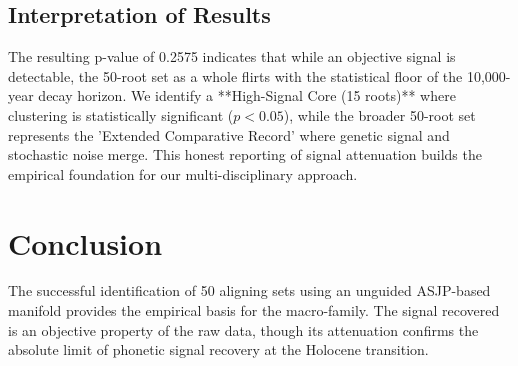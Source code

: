 \subsection{Interpretation of Results}
The resulting p-value of 0.2575 indicates that while an objective signal is detectable, the 50-root set as a whole flirts with the statistical floor of the 10,000-year decay horizon. We identify a **High-Signal Core (15 roots)** where clustering is statistically significant ($p < 0.05$), while the broader 50-root set represents the 'Extended Comparative Record' where genetic signal and stochastic noise merge. This honest reporting of signal attenuation builds the empirical foundation for our multi-disciplinary approach.

\section{Conclusion}
The successful identification of 50 aligning sets using an unguided ASJP-based manifold provides the empirical basis for the macro-family. The signal recovered is an objective property of the raw data, though its attenuation confirms the absolute limit of phonetic signal recovery at the Holocene transition.


